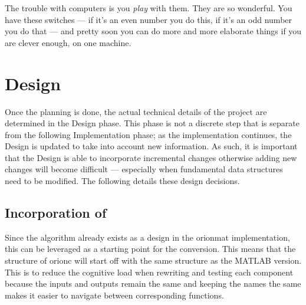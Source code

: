 \begin{savequote}[0.55\linewidth]
	\begin{fancyquote}
		The trouble with computers is you \emph{play} with them. They are so
		wonderful. You have these switches --- if it's an even number you do
		this, if it's an odd number you do that --- and pretty soon you can
		do more and more elaborate things if you are clever enough, on one
		machine.
	\end{fancyquote}
\end{savequote}
\chapter{Design}\label{ch:design}

Once the planning is done, the actual technical details of the
project are determined in the Design phase. This phase is not a
discrete step that is separate from the following Implementation
phase; as the implementation continues, the Design is updated to
take into account new information. As such, it is important that
the Design is able to incorporate incremental changes otherwise
adding new changes will become difficult --- especially
when fundamental data structures need to be modified. The following
details these design decisions.

\section{Incorporation of }

Since the algorithm already exists as a design in the \gls{orionmat}
implementation, this can be leveraged as a starting point for the
conversion. This means that the structure of \gls{orionc} will
start off with the same structure as the MATLAB version. This is
to reduce the cognitive load when rewriting and testing each
component because the inputs and outputs remain the same and
keeping the names the same makes it easier to navigate between
corresponding functions.

